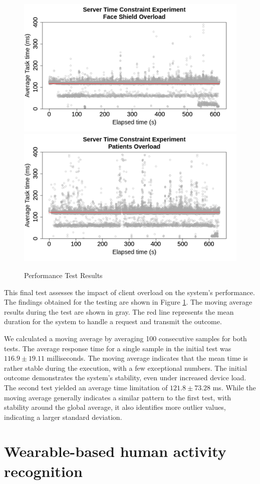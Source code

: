 \begin{figure}[h!]
    \centering
    \includegraphics[width = .7\linewidth]{Figures/server-t1-times.png}
    \includegraphics[width = .7\linewidth]{Figures/server-t2-times.png}
    \caption{Performance Test Results}
    \label{fig:test-results}
\end{figure}

This final test assesses the impact of client overload on the system's performance. The findings obtained for the testing are shown in Figure \ref{fig:test-results}. The moving average results during the test are shown in gray. The red line represents the mean duration for the system to handle a request and transmit the outcome.

We calculated a moving average by averaging 100 consecutive samples for both tests. The average response time for a single sample in the initial test was $116.9 \pm 19.11$ milliseconds. The moving average indicates that the mean time is rather stable during the execution, with a few exceptional numbers. The initial outcome demonstrates the system's stability, even under increased device load. The second test yielded an average time limitation of $121.8 \pm 73.28$ ms. While the moving average generally indicates a similar pattern to the first test, with stability around the global average, it also identifies more outlier values, indicating a larger standard deviation.

\section{Wearable-based human activity recognition}

